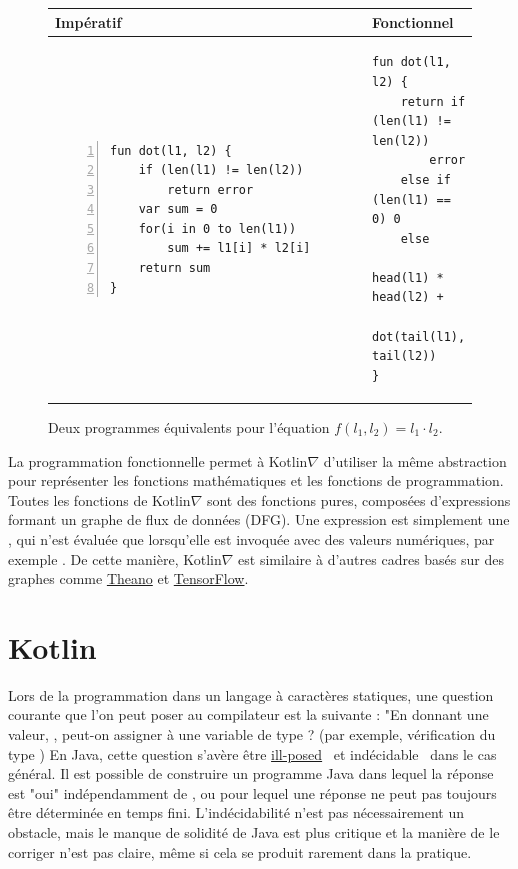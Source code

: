 \begin{figure}[t]
    \centering
    \begin{tabular}{|l|l|}
        \hline
        Impératif & Fonctionnel \\
        \hline
{\begin{lstlisting}[style=barelisting, linewidth=5.7cm, numbers=left]
fun dot(l1, l2) {
    if (len(l1) != len(l2))
        return error
    var sum = 0
    for(i in 0 to len(l1))
        sum += l1[i] * l2[i]
    return sum
}
\end{lstlisting}}
        &
{\begin{lstlisting}[style=barelisting, linewidth=6.5cm, numbers=none]
fun dot(l1, l2) {
    return if (len(l1) != len(l2))
        error
    else if (len(l1) == 0) 0
    else
        head(l1) * head(l2) +
        dot(tail(l1), tail(l2))
}
\end{lstlisting}}
        \\
        \hline
    \end{tabular}
    \caption{Deux programmes équivalents pour l'équation $f(l_1, l_2) = l_1 \cdot l_2$.}
    \label{fig:fp_vs_ip}
\end{figure}

La programmation fonctionnelle permet à Kotlin$\nabla$ d'utiliser la même abstraction pour représenter les fonctions mathématiques et les fonctions de programmation. Toutes les fonctions de Kotlin$\nabla$ sont des fonctions pures, composées d'expressions formant un graphe de flux de données (DFG). Une expression est simplement une , qui n'est évaluée que lorsqu'elle est invoquée avec des valeurs numériques, par exemple . De cette manière, Kotlin$\nabla$ est similaire à d'autres cadres basés sur des graphes comme \href{http://deeplearning.net/software/theano/extending/graphstructures.html}{Theano} et \href{https://www.tensorflow.org/guide/graphs}{TensorFlow}.

\section{Kotlin}\label{sec:kotlin}

Lors de la programmation dans un langage à caractères statiques, une question courante que l'on peut poser au compilateur est la suivante : "En donnant une valeur, , peut-on assigner  à une variable de type ? (par exemple, vérification du type ) En Java, cette question s'avère être \href{http://io.livecode.ch/learn/namin/unsound}{ill-posed}~\citep{amin2016java} et indécidable~\citep{grigore2017java} dans le cas général. Il est possible de construire un programme Java dans lequel la réponse est "oui" indépendamment de , ou pour lequel une réponse ne peut pas toujours être déterminée en temps fini. L'indécidabilité n'est pas nécessairement un obstacle, mais le manque de solidité de Java est plus critique et la manière de le corriger n'est pas claire, même si cela se produit rarement dans la pratique.


